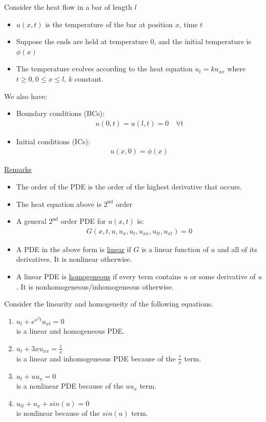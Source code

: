 \documentclass[12pt, letterpaper]{article}
\begin{document}
 Consider the heat flow in a bar of length $l$ 
\begin{itemize}
    \item $u(x,t)$ is the temperature of the bar at position $x$, time $t$
    \item Suppose the ends are held at temperature 0, and the initial temperature
    is $\phi(x)$
    \item The temperature evolves according to the heat equation $u_t = ku_{xx}$
    where $t \ge 0, 0 \le x \le l$, $k $ constant.
\end{itemize}
We also have:
\begin{itemize}
    \item Boundary conditions (BCs): 
    \begin{align*}
        u(0,t) = u(l,t) = 0\quad \forall t
    \end{align*}
    \item Initial conditions (ICs):
    \begin{align*}
        u(x,0) = \phi(x)
    \end{align*}
\end{itemize}
\underline{Remarks}
\begin{itemize}
    \item The order of the PDE is the order of the highest derivative that occurs.
    \item The heat equation above is $2^{\text{nd}}$ order
    \item A general $2^{\text{nd}}$ order PDE for $u(x,t)$ is: 
    \begin{align*}
        G(x,t,u,u_x,u_t,u_{xx},u_{tt},u_{xt}) = 0
    \end{align*}
    \item A PDE in the above form is \underline{linear} if $G$ is a linear function of 
    $u$ and all of its derivatives. It is nonlinear otherwise.
    \item A linear PDE is \underline{homogeneous} if  every term contains $u$ or some 
    derivative of $u$. It is nonhomogeneous/inhomogeneous otherwise.
\end{itemize}
 Consider the linearity and homogeneity of the following equations.
\begin{enumerate}
    \item $u_t + e^{x^2t}u_{xt} = 0$ \\
    is a linear and homogeneous PDE.
    \item $u_t + 3xu_{xx} = \frac tx$ \\
    is a linear and inhomogeneous PDE because of the $\frac tx$ term.
    \item $u_t + uu_x = 0$ \\
    is a nonlinear PDE because of the $uu_x$ term.
    \item $u_{tt} + u_{x} + sin(u) = 0$ \\
    is nonlinear because of the $sin(u)$ term.
\end{enumerate}
\end{document}
